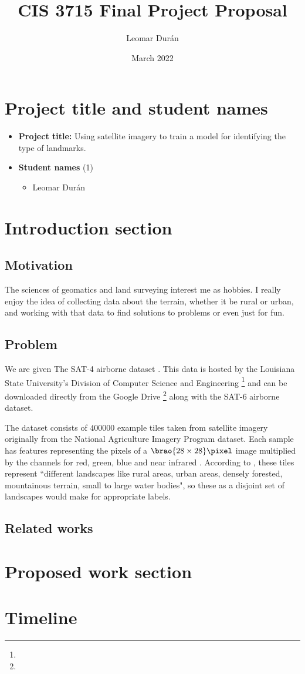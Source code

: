 \documentclass[11pt]{article}
\title{CIS 3715 Final Project Proposal}
\author{Leomar Durán}
\date{March 2022}
\DeclarePairedDelimiter\brao()%
\begin{document}
\section{Project title and student names}
\begin{itemize}
    \item
        \textbf{Project title:}
        Using satellite imagery to train a model for identifying the type of landmarks.
    \item
        \textbf{Student names} (1)
        \begin{itemize}
            \item
                Leomar Durán
        \end{itemize}
\end{itemize}

\section{Introduction section}

\subsection{Motivation}

The sciences of geomatics and land surveying interest me as hobbies.
I really enjoy the idea of collecting data about the terrain,
whether it be rural or urban,
and working with that data to find solutions to problems
or even just for fun.

\subsection{Problem}

We are given
The SAT-4 airborne dataset%
\cite{Basu2015a}.
This data is hosted by the Louisiana State University's Division of Computer Science and Engineering%
\footnote{%
}
and can be downloaded directly from the Google Drive%
\footnote{%
}
along with the SAT-6 airborne dataset.

The dataset consists of \(\num{400000}\) example tiles
taken from satellite imagery originally from the National Agriculture Imagery Program  dataset.
Each sample has features representing the pixels of a \(\SI[parse-numbers=false]{\brao{28\times28}\!}\pixel\) image 
multiplied by the channels for red, green, blue and near infrared .
According to \textcite{Basu2015a},
these tiles represent ``different landscapes like rural areas, urban areas, densely forested, mountainous terrain, small to large water bodies",
so these as a disjoint set of landscapes would make for appropriate labels.

\subsection{Related works}

\section{Proposed work section}
\section{Timeline}

\printbibliography
\end{document}
